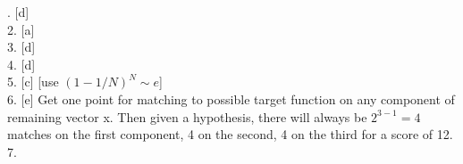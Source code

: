 \documentclass[12pt]{article}
\begin{document}
. [d] \\
2. [a] \\
3. [d] \\
4. [d] \\
5. [c] [use ${(1-1/N)}^{N}\sim{}e$]\\
6. [e] Get one point for matching to possible target function on any
component of remaining vector x. Then given a hypothesis, there will
always be $2^{3-1}=4$ matches on the first component, 4 on the second,
4 on the third for a score of 12. \\
7.
\end{document}
